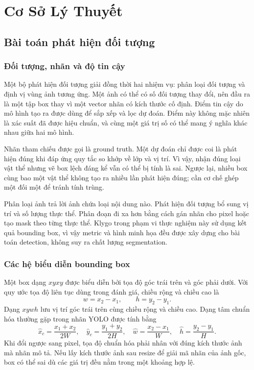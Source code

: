 \chapter{Cơ Sở Lý Thuyết}
\label{chap:theory}
\section{Bài toán phát hiện đối tượng}
\subsection{Đối tượng, nhãn và độ tin cậy}
Một bộ phát hiện đối tượng giải đồng thời hai nhiệm vụ: phân loại đối tượng và định vị vùng ảnh tương ứng. Một ảnh có thể có số đối tượng thay đổi, nên đầu ra là một tập box thay vì một vector nhãn có kích thước cố định. Điểm tin cậy do mô hình tạo ra được dùng để sắp xếp và lọc dự đoán. Điểm này không mặc nhiên là xác suất đã được hiệu chuẩn, và cùng một giá trị số có thể mang ý nghĩa khác nhau giữa hai mô hình.

Nhãn tham chiếu được gọi là ground truth. Một dự đoán chỉ được coi là phát hiện đúng khi đáp ứng quy tắc so khớp về lớp và vị trí. Vì vậy, nhận đúng loại vật thể nhưng vẽ box lệch đáng kể vẫn có thể bị tính là sai. Ngược lại, nhiều box cùng bao một vật thể không tạo ra nhiều lần phát hiện đúng; cần cơ chế ghép một đối một để tránh tính trùng.

Phân loại ảnh trả lời ảnh chứa loại nội dung nào. Phát hiện đối tượng bổ sung vị trí và số lượng thực thể. Phân đoạn đi xa hơn bằng cách gán nhãn cho pixel hoặc tạo mask theo từng thực thể. Klygo trong phạm vi thực nghiệm này sử dụng kết quả bounding box, vì vậy metric và hình minh họa đều được xây dựng cho bài toán detection, không suy ra chất lượng segmentation.

\subsection{Các hệ biểu diễn bounding box}
Một box dạng $xyxy$ được biểu diễn bởi tọa độ góc trái trên và góc phải dưới. Với quy ước tọa độ liên tục dùng trong đánh giá, chiều rộng và chiều cao là
\begin{equation}
w=x_2-x_1,\qquad h=y_2-y_1.
\end{equation}
Dạng $xywh$ lưu vị trí góc trái trên cùng chiều rộng và chiều cao. Dạng tâm chuẩn hóa thường gặp trong nhãn YOLO được tính bằng
\begin{equation}
\hat{x}_c=\frac{x_1+x_2}{2W},\quad
\hat{y}_c=\frac{y_1+y_2}{2H},\quad
\hat{w}=\frac{x_2-x_1}{W},\quad
\hat{h}=\frac{y_2-y_1}{H}.
\end{equation}
Khi đổi ngược sang pixel, tọa độ chuẩn hóa phải nhân với đúng kích thước ảnh mà nhãn mô tả. Nếu lấy kích thước ảnh sau resize để giải mã nhãn của ảnh gốc, box có thể sai dù các giá trị đều nằm trong một khoảng hợp lệ.

